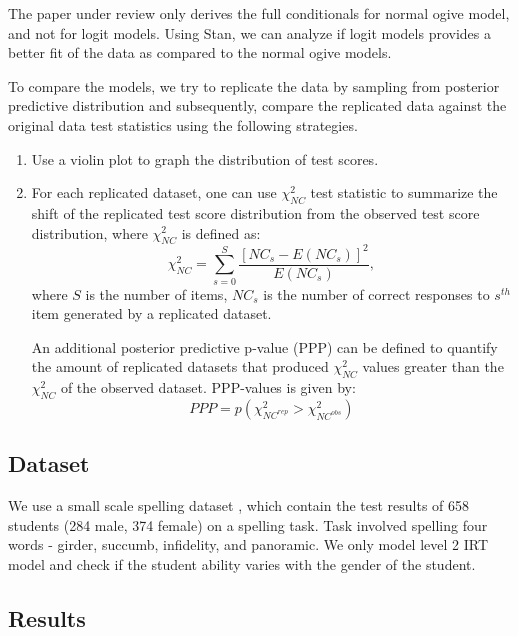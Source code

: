 \documentclass[12pt]{article}
\begin{document}
The paper under review \cite{fox2001bayesian} only derives the full conditionals for normal ogive model, and not for logit models. Using Stan, we can analyze if logit models provides a better fit of the data as compared to the normal ogive models.

To compare the models, we try to replicate the data by sampling from posterior predictive distribution and subsequently, compare the replicated data against the original data test statistics using the following strategies.
\begin{enumerate}
    \item Use a violin plot to graph the distribution of test scores.
    \item For each replicated dataset, one can use $\chi^2_{NC}$ test statistic \cite{beguin2001mcmc} to summarize the shift of the replicated test score distribution from the observed test score distribution, where $\chi^2_{NC}$ is defined as:
    \begin{equation*}
        \chi^2_{NC} = \sum_{s=0}^S \frac{[NC_s - E(NC_s)]^2}{E(NC_s)},
    \end{equation*} where
    $S$ is the number of items, $NC_s$ is the number of correct responses to $s^{th}$ item generated by a replicated dataset.
    
    An additional posterior predictive p-value (PPP) can be defined to quantify the amount of replicated datasets that produced $\chi^2_{NC}$ values greater than the $\chi^2_{NC}$ of the observed dataset. PPP-values is given by:
    \begin{equation*}
        PPP = p(\chi^2_{NC^{rep}} > \chi^2_{NC^{obs}})
    \end{equation*}
\end{enumerate}

\subsection{Dataset}

We use a small scale spelling dataset \cite{thissen1993detection}, which contain the test results of 658 students (284 male, 374 female) on a spelling task. Task involved spelling four words - girder, succumb, infidelity, and panoramic. We only model level 2 IRT model and check if the student ability varies with the gender of the student.

\subsection{Results}
\end{document}

